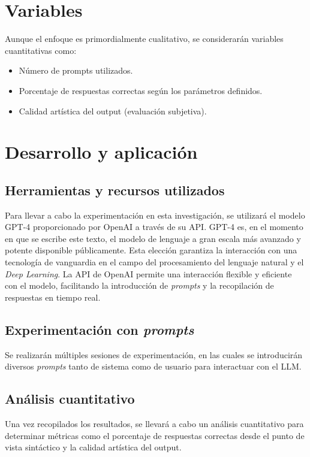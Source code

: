 \section{Variables}
Aunque el enfoque es primordialmente cualitativo, se considerarán variables cuantitativas como:
\begin{itemize}
    \item Número de prompts utilizados.
    \item Porcentaje de respuestas correctas según los parámetros definidos.
    \item Calidad artística del output (evaluación subjetiva).
\end{itemize}

\section{Desarrollo y aplicación}

\subsection{Herramientas y recursos utilizados}
Para llevar a cabo la experimentación en esta investigación, se utilizará el modelo GPT-4 proporcionado por OpenAI a través de su API. GPT-4 es, en el momento en que se escribe este texto, el modelo de lenguaje a gran escala más avanzado y potente disponible públicamente. Esta elección garantiza la interacción con una tecnología de vanguardia en el campo del procesamiento del lenguaje natural y el \textit{Deep Learning}. La API de OpenAI permite una interacción flexible y eficiente con el modelo, facilitando la introducción de \textit{prompts} y la recopilación de respuestas en tiempo real.

\subsection{Experimentación con \textit{prompts}}
Se realizarán múltiples sesiones de experimentación, en las cuales se introducirán diversos \textit{prompts} tanto de sistema como de usuario para interactuar con el LLM.

\subsection{Análisis cuantitativo}
Una vez recopilados los resultados, se llevará a cabo un análisis cuantitativo para determinar métricas como el porcentaje de respuestas correctas desde el punto de vista sintáctico y la calidad artística del output.

